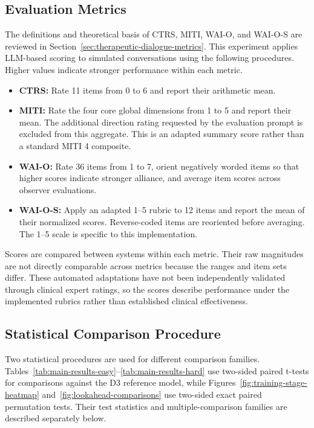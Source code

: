 \subsection{Evaluation Metrics}
\label{sec:evaluation-metric-scoring}

The definitions and theoretical basis of CTRS, MITI, WAI-O, and WAI-O-S are reviewed in Section~\ref{sec:therapeutic-dialogue-metrics}. This experiment applies LLM-based scoring to simulated conversations using the following procedures. Higher values indicate stronger performance within each metric.

\begin{itemize}
    \item \textbf{CTRS:} Rate 11 items from 0 to 6 and report their arithmetic mean.

    \item \textbf{MITI:} Rate the four core global dimensions from 1 to 5 and report their mean. The additional direction rating requested by the evaluation prompt is excluded from this aggregate. This is an adapted summary score rather than a standard MITI 4 composite.

    \item \textbf{WAI-O:} Rate 36 items from 1 to 7, orient negatively worded items so that higher scores indicate stronger alliance, and average item scores across observer evaluations.

    \item \textbf{WAI-O-S:} Apply an adapted 1--5 rubric to 12 items and report the mean of their normalized scores. Reverse-coded items are reoriented before averaging. The 1--5 scale is specific to this implementation.
\end{itemize}

Scores are compared between systems within each metric. Their raw magnitudes are not directly comparable across metrics because the ranges and item sets differ. These automated adaptations have not been independently validated through clinical expert ratings, so the scores describe performance under the implemented rubrics rather than established clinical effectiveness.

\subsection{Statistical Comparison Procedure}
\label{sec:paired-permutation-tests}

Two statistical procedures are used for different comparison families. Tables~\ref{tab:main-results-easy}--\ref{tab:main-results-hard} use two-sided paired t-tests for comparisons against the D3 reference model, while Figures~\ref{fig:training-stage-heatmap} and~\ref{fig:lookahead-comparisons} use two-sided exact paired permutation tests. Their test statistics and multiple-comparison families are described separately below.

